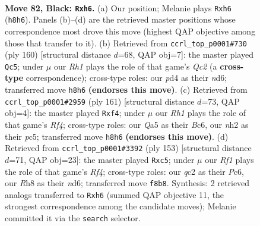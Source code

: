 \documentclass[11pt]{article}
\begin{document}
\clearpage

\begin{figure}[p]\centering
\begin{subfigure}{0.46\textwidth}\centering
\resizebox{\linewidth}{!}{%
\newchessgame
\chessboard[
  setfen={5r1r/p2k2p1/7P/q6P/3P4/4P3/2Q4N/4b2K b - - 0 82},
  showmover=false,
  pgfstyle=straightmove, color=movearrow, markmove={h8-h6}
]}
\caption{}
\end{subfigure}\hfill
\begin{subfigure}{0.46\textwidth}\centering
\resizebox{\linewidth}{!}{%
\newchessgame
\chessboard[
  setfen={5k2/2R3p1/3n2p1/4p3/1P4q1/8/1KQ5/8 w - - 37 81},
  showmover=false,
  pgfstyle=straightmove, color=movearrow, markmove={c2-c5}
]}
\caption{}
\end{subfigure}
\\[4pt]
\begin{subfigure}{0.46\textwidth}\centering
\resizebox{\linewidth}{!}{%
\newchessgame
\chessboard[
  setfen={8/6Q1/2b2r2/1pP2r1k/1P3P2/8/3K4/8 b - - 21 81},
  showmover=false,
  pgfstyle=straightmove, color=movearrow, markmove={f5-f4}
]}
\caption{}
\end{subfigure}\hfill
\begin{subfigure}{0.46\textwidth}\centering
\resizebox{\linewidth}{!}{%
\newchessgame
\chessboard[
  setfen={7k/5p2/2pNp2P/2P2rb1/8/5P1K/1R6/8 b - - 1 77},
  showmover=false,
  pgfstyle=straightmove, color=movearrow, markmove={f5-c5}
]}
\caption{}
\end{subfigure}
\caption{\textbf{Move 82, Black: \texttt{Rxh6}.} (a) Our position; Melanie plays \texttt{Rxh6} (\texttt{h8h6}). Panels (b)--(d) are the retrieved master positions whose correspondence most drove this move (highest QAP objective among those that transfer to it). (b) Retrieved from \texttt{ccrl\_top\_p0001\#730} (ply 160) [structural distance $d$=68, QAP obj=7]: the master played \texttt{Qc5}; under $\mu$ our \emph{Rh1} plays the role of that game's \emph{Qc2} (a \textbf{cross-type} correspondence); cross-type roles: our \emph{p}d4 as their \emph{n}d6; transferred move \texttt{h8h6} \textbf{(endorses this move)}. (c) Retrieved from \texttt{ccrl\_top\_p0001\#2959} (ply 161) [structural distance $d$=73, QAP obj=4]: the master played \texttt{Rxf4}; under $\mu$ our \emph{Rh1} plays the role of that game's \emph{Rf4}; cross-type roles: our \emph{Q}a5 as their \emph{B}c6, our \emph{n}h2 as their \emph{p}c5; transferred move \texttt{h8h6} \textbf{(endorses this move)}. (d) Retrieved from \texttt{ccrl\_top\_p0001\#3392} (ply 153) [structural distance $d$=71, QAP obj=23]: the master played \texttt{Rxc5}; under $\mu$ our \emph{Rf1} plays the role of that game's \emph{Rf4}; cross-type roles: our \emph{q}c2 as their \emph{P}c6, our \emph{R}h8 as their \emph{n}d6; transferred move \texttt{f8b8}. Synthesis: 2 retrieved analogs transferred to \texttt{Rxh6} (summed QAP objective 11, the strongest correspondence among the candidate moves); Melanie committed it via the \texttt{search} selector.}
\label{fig:thought-m163}
\end{figure}
\end{document}
